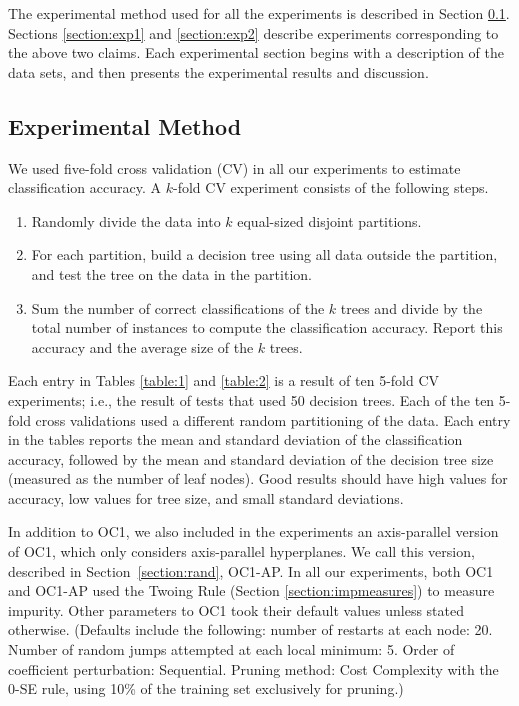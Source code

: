 The experimental method used for all the experiments is described
in Section \ref{section:expmethod}.  Sections \ref{section:exp1} and
\ref{section:exp2} describe experiments corresponding to the
above two claims.  Each experimental section begins with a description
of the data sets, and then presents the experimental results and
discussion.

\subsection{Experimental Method}
\label{section:expmethod}
We used five-fold cross validation (CV) in all our experiments to
estimate classification accuracy.  A $k$-fold CV experiment consists
of the following steps.
\begin{enumerate}
\itemsep -0.1in
\item Randomly divide the data into $k$ equal-sized disjoint partitions.
\item For each partition, build a decision tree using all data outside the
partition, and test the tree on the data in the partition.
\item Sum the number of correct classifications of the $k$ trees and divide
by the total number of instances to compute the classification accuracy. 
Report this accuracy and the average size of the $k$ trees.
\end{enumerate}
Each entry in Tables \ref{table:1} and \ref{table:2} is a result of
ten 5-fold CV experiments; i.e., the result of tests that used 50
decision trees.  Each of the ten 5-fold cross validations used a
different random partitioning of the data.  Each entry in the tables
reports the mean and standard deviation of the classification
accuracy, followed by the mean and standard deviation of the decision
tree size (measured as the number of leaf nodes).  Good results should
have high values for accuracy, low values for tree size, and small
standard deviations.

In addition to OC1, we also included in the experiments an
axis-parallel version of OC1, which only considers axis-parallel
hyperplanes.  We call this version, described in
Section~\ref{section:rand}, OC1-AP\@.  In all our experiments, both
OC1 and OC1-AP used the Twoing Rule (Section \ref{section:impmeasures})
to measure impurity.  Other parameters to OC1 took their default
values unless stated otherwise.  (Defaults include the following:
number of restarts at each node: 20.  Number of random jumps attempted
at each local minimum: 5.  Order of coefficient perturbation:
Sequential.  Pruning method: Cost Complexity with the 0-SE rule, using
10\% of the training set exclusively for pruning.)

